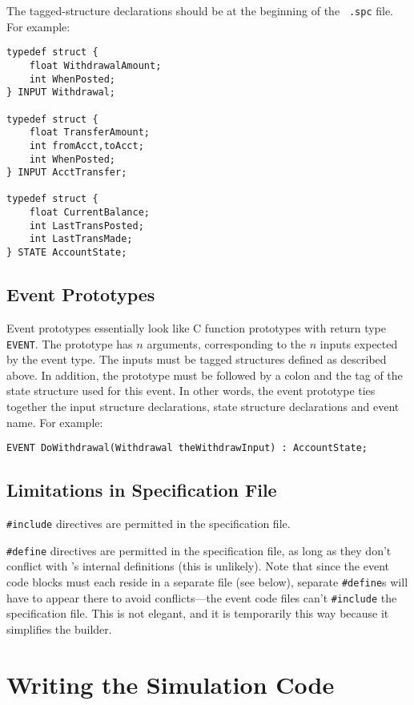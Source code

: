 The tagged-structure declarations should be at the beginning of the {\tt
.spc} file.  For example:

\begin{verbatim}
typedef struct {
	float WithdrawalAmount;
	int WhenPosted;
} INPUT Withdrawal;

typedef struct {
	float TransferAmount;
	int fromAcct,toAcct;
	int WhenPosted;
} INPUT AcctTransfer;

typedef struct {
	float CurrentBalance;
	int LastTransPosted;
	int LastTransMade;
} STATE AccountState;
\end{verbatim}

\subsection{Event Prototypes}

Event prototypes essentially look like C function prototypes with return
type {\tt EVENT}.  The prototype has $n$ arguments, corresponding to the
$n$ inputs expected by the event type.  The inputs must be tagged
structures defined as described above.  In addition, the prototype must
be followed by a colon and the tag of the state structure used for this
event.  In other words, the event prototype ties together the input
structure declarations, state structure declarations and event name.
For example:

\begin{verbatim}
EVENT DoWithdrawal(Withdrawal theWithdrawInput) : AccountState;
\end{verbatim}

\subsection{Limitations in Specification File}

{\tt \#include} directives are permitted in the specification file.

{\tt \#define} directives are permitted in the specification file, as
long as they don't conflict with \dispare's internal definitions (this
is unlikely).  Note that since the event code blocks must each reside in
a separate file (see below), separate {\tt \#define}s will have to appear
there to avoid conflicts---the event
code files can't {\tt \#include} the specification file.  This is not
elegant, and it is temporarily this way because it simplifies the
builder.
\section{Writing the Simulation Code}

